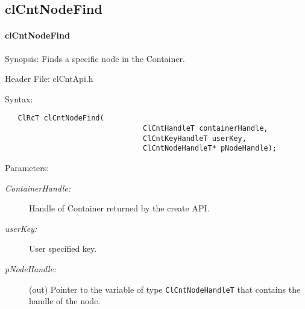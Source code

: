 \subsection{clCntNodeFind}
\hypertarget{pagecnt109}{}\paragraph{cl\-Cnt\-Node\-Find}\label{pagecnt109}
\begin{Desc}
\item[Synopsis:]Finds a specific node in the Container.\end{Desc}
\begin{Desc}
\item[Header File:]clCntApi.h\end{Desc}
\begin{Desc}
\item[Syntax:]

\footnotesize\begin{verbatim}   ClRcT clCntNodeFind(
                          		ClCntHandleT containerHandle,
                          		ClCntKeyHandleT userKey,
                          		ClCntNodeHandleT* pNodeHandle);
\end{verbatim}
\normalsize
\end{Desc}
\begin{Desc}
\item[Parameters:]
\begin{description}
\item[{\em Container\-Handle:}]Handle of Container returned by the create API. 
\item[{\em user\-Key:}]User specified key. 
\item[{\em p\-Node\-Handle:}](out) Pointer to the variable of type {\tt{Cl\-Cnt\-Node\-Handle\-T}} that contains 
the handle of the node.
\end{description}
\end{Desc}
